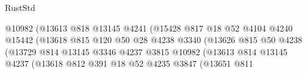\begin{lexlean}{RustStd}
\begin{coremodule}
                                                @10982
                                                (@13613
                                                  @818
                                                  @13145
                                                  @4241
                                                  (@15428
                                                    @817
                                                    @18
                                                    @52
                                                    @4104
                                                    @4240
                                                    @15442
                                                    (@13618
                                                      @815
                                                      @120
                                                      @50
                                                      @28
                                                      @4238
                                                      @3340
                                                      (@13626
                                                        @815
                                                        @50
                                                        @4238
                                                        (@13729
                                                          @814
                                                          @13145
                                                          @3346
                                                          @4237
                                                          @3815
                                                          @10982
                                                          (@13613
                                                            @814
                                                            @13145
                                                            @4237
                                                            (@13618
                                                              @812
                                                              @391
                                                              @18
                                                              @52
                                                              @4235
                                                              @3847
                                                              (@13651
                                                                @811

\end{coremodule}
\end{lexlean}
